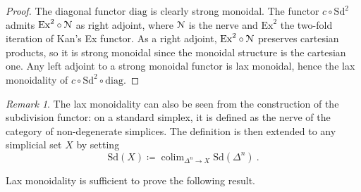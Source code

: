 \documentclass[a4paper,12pt]{amsart}
\renewcommand{\mathcal}{\EuScript}
\DeclareMathOperator*{\colim}{colim}
\theoremstyle{plain}
\theoremstyle{definition}
\theoremstyle{remark}
\newtheorem{remark}[theorem]{\sc Remark}%
\begin{document}
\begin{proof}

The diagonal functor $\mathrm{diag}$ is clearly strong monoidal. The functor $c\circ \mathrm{Sd}^2$ admits $\mathrm{Ex}^2\circ\mathcal{N}$ as right adjoint, where $\mathcal{N}$ is the nerve and $\mathrm{Ex}^2$ the two-fold iteration of Kan's Ex functor. As a right adjoint, $\mathrm{Ex}^2\circ\mathcal{N}$ preserves cartesian products, so it is strong monoidal since the monoidal structure is the cartesian one. Any left adjoint to a strong monoidal functor is lax monoidal, hence the lax monoidality of $c\circ \mathrm{Sd}^2\circ \mathrm{diag}$.
\end{proof}


\begin{remark}
The lax monoidality can also be seen from the construction of the subdivision functor: on a standard simplex, it is defined as the nerve of the category of non-degenerate simplices. The definition is then extended to any simplicial set $X$ by setting  
\[
\mathrm{Sd}(X) \coloneqq \colim_{\Delta^n \rightarrow X}\mathrm{Sd}(\Delta^n)~. 
\]
\end{remark}

Lax monoidality is sufficient to prove the following result. 
\end{document}
